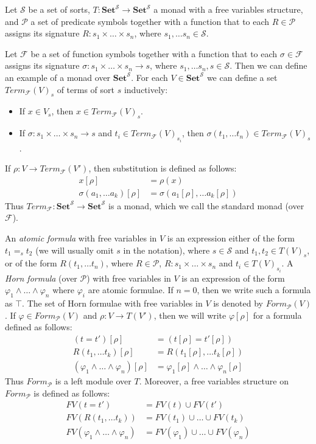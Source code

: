 \documentclass{elsarticle}
\theoremstyle{definition}
\theoremstyle{remark}
\newcommand{\cat}[1]{\mathbf{#1}}
\newcommand{\Set}{\cat{Set}}
\numberwithin{figure}{section}
\begin{document}
Let $\mathcal{S}$ be a set of sorts, $T : \Set^\mathcal{S} \to \Set^\mathcal{S}$ a monad with a free variables structure,
    and $\mathcal{P}$ a set of predicate symbols together with a function that to each $R \in \mathcal{P}$
    assigns its signature $R : s_1 \times \ldots \times s_n$, where $s_1, \ldots s_n \in \mathcal{S}$.

Let $\mathcal{F}$ be a set of function symbols together with a function that to each $\sigma \in \mathcal{F}$ assigns its signature $\sigma : s_1 \times \ldots \times s_n \to s$, where $s_1, \ldots s_n, s \in \mathcal{S}$.
Then we can define an example of a monad over $\Set^\mathcal{S}$.
For each $V \in \Set^\mathcal{S}$ we can define a set $Term_\mathcal{F}(V)_s$ of terms of sort $s$ inductively:
\begin{itemize}
\item If $x \in V_s$, then $x \in Term_\mathcal{F}(V)_s$.
\item If $\sigma : s_1 \times \ldots \times s_n \to s$ and $t_i \in Term_\mathcal{F}(V)_{s_i}$, then $\sigma(t_1, \ldots t_n) \in Term_\mathcal{F}(V)_s$.
\end{itemize}
If $\rho : V \to Term_\mathcal{F}(V')$, then substitution is defined as follows:
\begin{align*}
x[\rho] & = \rho(x) \\
\sigma(a_1, \ldots a_k)[\rho] & = \sigma(a_1[\rho], \ldots a_k[\rho])
\end{align*}
Thus $Term_\mathcal{F} : \Set^\mathcal{S} \to \Set^\mathcal{S}$ is a monad, which we call the standard monad (over $\mathcal{F}$).

An \emph{atomic formula} with free variables in $V$ is an expression either of the form $t_1 =_s t_2$ (we will usually omit $s$ in the notation),
    where $s \in \mathcal{S}$ and $t_1, t_2 \in T(V)_s$, or of the form $R(t_1, \ldots t_n)$, where $R \in \mathcal{P}$, $R : s_1 \times \ldots \times s_n$ and $t_i \in T(V)_{s_i}$.
A \emph{Horn formula} (over $\mathcal{P}$) with free variables in $V$ is an expression of the form $\varphi_1 \land \ldots \land \varphi_n$ where $\varphi_i$ are atomic formulae.
If $n = 0$, then we write such a formula as $\top$.
The set of Horn formulae with free variables in $V$ is denoted by $Form_\mathcal{P}(V)$.
If $\varphi \in Form_\mathcal{P}(V)$ and $\rho : V \to T(V')$, then we will write $\varphi[\rho]$ for a formula defined as follows:
\begin{align*}
(t = t')[\rho] & = (t[\rho] = t'[\rho]) \\
R(t_1, \ldots t_k)[\rho] & = R(t_1[\rho], \ldots t_k[\rho]) \\
(\varphi_1 \land \ldots \land \varphi_n)[\rho] & = \varphi_1[\rho] \land \ldots \land \varphi_n[\rho]
\end{align*}
Thus $Form_\mathcal{P}$ is a left module over $T$.
Moreover, a free variables structure on $Form_\mathcal{P}$ is defined as follows:
\begin{align*}
FV(t = t') & = FV(t) \cup FV(t') \\
FV(R(t_1, \ldots t_k)) & = FV(t_1) \cup \ldots \cup FV(t_k) \\
FV(\varphi_1 \land \ldots \land \varphi_n) & = FV(\varphi_1) \cup \ldots \cup FV(\varphi_n)
\end{align*}
\end{document}
